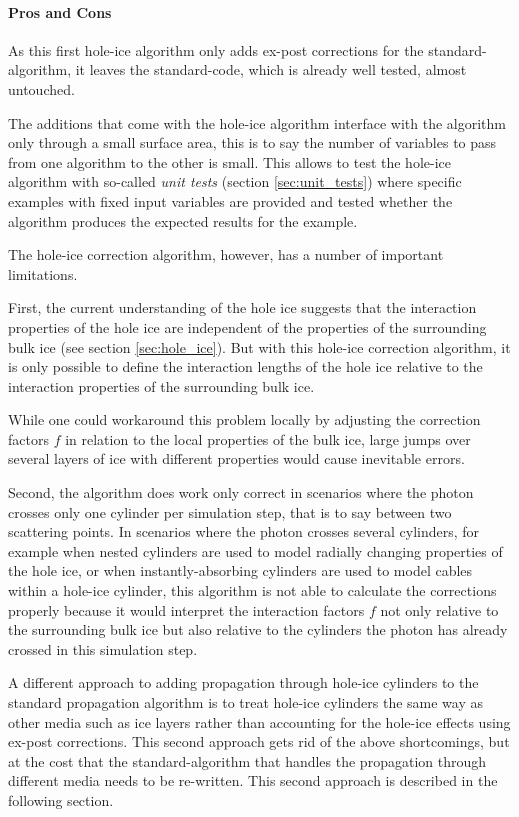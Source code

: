 \paragraph{Pros and Cons}
As this first hole-ice algorithm only adds ex-post corrections for the standard-\clsim algorithm, it leaves the standard-\clsim code, which is already well tested, almost untouched.

The additions that come with the hole-ice algorithm interface with the \clsim algorithm only through a small surface area, this is to say the number of variables to pass from one algorithm to the other is small. This allows to test the hole-ice algorithm with so-called \textit{unit tests} (section \ref{sec:unit_tests}) where specific examples with fixed input variables are provided and tested whether the algorithm produces the expected results for the example.

The hole-ice correction algorithm, however, has a number of important limitations.

First, the current understanding of the hole ice suggests that the interaction properties of the hole ice are independent of the properties of the surrounding bulk ice (see section \ref{sec:hole_ice}). But with this hole-ice correction algorithm, it is only possible to define the interaction lengths of the hole ice relative to the interaction properties of the surrounding bulk ice.

While one could workaround this problem locally by adjusting the correction factors $f$ in relation to the local properties of the bulk ice, large jumps over several layers of ice with different properties would cause inevitable errors.

Second, the algorithm does work only correct in scenarios where the photon crosses only one cylinder per simulation step, that is to say between two scattering points. In scenarios where the photon crosses several cylinders, for example when nested cylinders are used to model radially changing properties of the hole ice, or when instantly-absorbing cylinders are used to model cables within a hole-ice cylinder, this algorithm is not able to calculate the corrections properly because it would interpret the interaction factors $f$ not only relative to the surrounding bulk ice but also relative to the cylinders the photon has already crossed in this simulation step.

A different approach to adding propagation through hole-ice cylinders to the standard propagation algorithm is to treat hole-ice cylinders the same way as other media such as ice layers rather than accounting for the hole-ice effects using ex-post corrections. This second approach gets rid of the above shortcomings, but at the cost that the standard-\clsim algorithm that handles the propagation through different media needs to be re-written. This second approach is described in the following section.